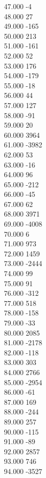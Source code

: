 { 47.000	-4 \\
 48.000	27 \\
 49.000	-165 \\
 50.000	213 \\
 51.000	-161 \\
 52.000	52 \\
 53.000	176 \\
 54.000	-179 \\
 55.000	-18 \\
 56.000	44 \\
 57.000	127 \\
 58.000	-91 \\
 59.000	20 \\
 60.000	3964 \\
 61.000	-3982 \\
 62.000	53 \\
 63.000	-16 \\
 64.000	96 \\
 65.000	-212 \\
 66.000	-45 \\
 67.000	62 \\
 68.000	3971 \\
 69.000	-4008 \\
 70.000	6 \\
 71.000	973 \\
 72.000	1459 \\
 73.000	-2444 \\
 74.000	99 \\
 75.000	91 \\
 76.000	-312 \\
 77.000	518 \\
 78.000	-158 \\
 79.000	-33 \\
 80.000	2085 \\
 81.000	-2178 \\
 82.000	-118 \\
 83.000	303 \\
 84.000	2766 \\
 85.000	-2954 \\
 86.000	-61 \\
 87.000	169 \\
 88.000	-244 \\
 89.000	257 \\
 90.000	-115 \\
 91.000	-89 \\
 92.000	2857 \\
 93.000	746 \\
 94.000	-3527 \\
}
